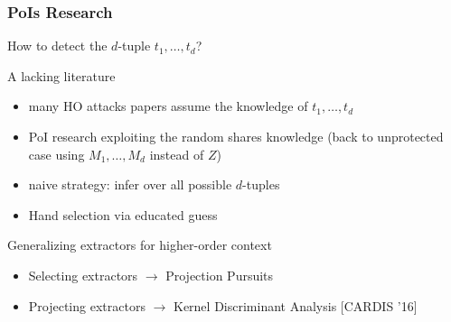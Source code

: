 \begin{frame}
\frametitle{PoIs Research}
How to detect the $d$-tuple $t_1,\dots, t_d$? 
\begin{block}{A lacking literature}
\begin{itemize}
\item many HO attacks papers assume the knowledge of $t_1,\dots, t_d$
\item PoI research exploiting the random shares knowledge (back to unprotected case using $M_1,\dots , M_d$ instead of $Z$)
\item naive strategy: infer over all possible $d$-tuples 
\item Hand selection via educated guess \cite{Oswald2006}
\end{itemize}
\end{block}

\begin{block}{Generalizing extractors for higher-order context}
\begin{itemize}
\item Selecting extractors $\longrightarrow$ Projection Pursuits \cite{PP}
\item Projecting extractors $\longrightarrow$ Kernel Discriminant Analysis [CARDIS '16]
\end{itemize}
\end{block}
\end{frame}

